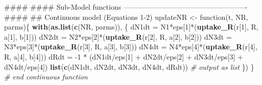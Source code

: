 \documentclass[11pt,]{article}
\newenvironment{Shaded}{\begin{snugshade}}{\end{snugshade}}
\newcommand{\KeywordTok}[1]{\textcolor[rgb]{0.13,0.29,0.53}{\textbf{{#1}}}}
\newcommand{\DecValTok}[1]{\textcolor[rgb]{0.00,0.00,0.81}{{#1}}}
\newcommand{\StringTok}[1]{\textcolor[rgb]{0.31,0.60,0.02}{{#1}}}
\newcommand{\CommentTok}[1]{\textcolor[rgb]{0.56,0.35,0.01}{\textit{{#1}}}}
\newcommand{\NormalTok}[1]{{#1}}
\begin{document}
\begin{Shaded}
\begin{Highlighting}[]
  
  \NormalTok{####}
  \NormalTok{####  Sub-Model functions ----------------------------------------------------}
  \NormalTok{####}
  \NormalTok{## Continuous model (Equations 1-2)}
  \NormalTok{updateNR <-}\StringTok{ }\NormalTok{function(t, NR, parms)\{}
    \KeywordTok{with}\NormalTok{(}\KeywordTok{as.list}\NormalTok{(}\KeywordTok{c}\NormalTok{(NR, parms)), \{}
      \NormalTok{dN1dt =}\StringTok{ }\NormalTok{N1*eps[}\DecValTok{1}\NormalTok{]*(}\KeywordTok{uptake_R}\NormalTok{(r[}\DecValTok{1}\NormalTok{], R, a[}\DecValTok{1}\NormalTok{], b[}\DecValTok{1}\NormalTok{]))}
      \NormalTok{dN2dt =}\StringTok{ }\NormalTok{N2*eps[}\DecValTok{2}\NormalTok{]*(}\KeywordTok{uptake_R}\NormalTok{(r[}\DecValTok{2}\NormalTok{], R, a[}\DecValTok{2}\NormalTok{], b[}\DecValTok{2}\NormalTok{]))}
      \NormalTok{dN3dt =}\StringTok{ }\NormalTok{N3*eps[}\DecValTok{3}\NormalTok{]*(}\KeywordTok{uptake_R}\NormalTok{(r[}\DecValTok{3}\NormalTok{], R, a[}\DecValTok{3}\NormalTok{], b[}\DecValTok{3}\NormalTok{]))}
      \NormalTok{dN4dt =}\StringTok{ }\NormalTok{N4*eps[}\DecValTok{4}\NormalTok{]*(}\KeywordTok{uptake_R}\NormalTok{(r[}\DecValTok{4}\NormalTok{], R, a[}\DecValTok{4}\NormalTok{], b[}\DecValTok{4}\NormalTok{]))}
      \NormalTok{dRdt  =}\StringTok{ }\NormalTok{-}\DecValTok{1} \NormalTok{*}\StringTok{ }\NormalTok{(dN1dt/eps[}\DecValTok{1}\NormalTok{] +}\StringTok{ }\NormalTok{dN2dt/eps[}\DecValTok{2}\NormalTok{] +}\StringTok{ }\NormalTok{dN3dt/eps[}\DecValTok{3}\NormalTok{] +}\StringTok{ }\NormalTok{dN4dt/eps[}\DecValTok{4}\NormalTok{])}
      \KeywordTok{list}\NormalTok{(}\KeywordTok{c}\NormalTok{(dN1dt, dN2dt, dN3dt, dN4dt, dRdt)) }\CommentTok{# output as list}
    \NormalTok{\})}
  \NormalTok{\} }\CommentTok{# end continuous function}
  

\end{Highlighting}
\end{Shaded}
\end{document}
